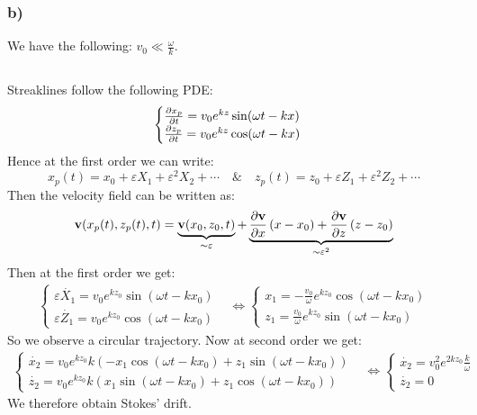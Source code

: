 \documentclass[10pt,a4paper]{book}
\begin{document}
\subsubsection{b)}
We have the following: $v_0 \ll \frac{\omega}{k}$.

\subsection{}
Streaklines follow the following PDE:
\begin{align*}
\begin{cases}
\pdv{x_p}{t} = v_0 e^{kz} \sin(\omega t - kx)\\
\pdv{z_p}{t} = v_0 e^{kz} \cos(\omega t - k x)
\end{cases}
\end{align*}
Hence at the first order we can write:
\[
x_p(t) = x_0 + \varepsilon X_1  + \varepsilon^2 X_2 + \cdots\quad \& \quad z_p(t) = z_0 + \varepsilon Z_1 + \varepsilon^2 Z_2 + \cdots
\]
Then the velocity field can be written as:
\[
\mathbf{\mathbf{v}}(x_p(t), z_p(t), t) = \underbrace{\mathbf{v}(x_0, z_0, t)}_{\sim \varepsilon} + \underbrace{\pdv{\mathbf{v}}{x} \left(x - x_0\right) + \pdv{\mathbf{v}}{z} \left(z - z_0\right)}_{\sim \varepsilon^2}
\]
Then at the first order we get:
\begin{align*}
\begin{cases}
\varepsilon \dot{X_1} = v_0 e^{kz_0}\sin(\omega t - k x_0)\\
\varepsilon \dot{Z_1} = v_0 e^{k z_0 }\cos(\omega t - k x_0)
\end{cases} &\Leftrightarrow \begin{cases}
x_1 = -\frac{v_0}{\omega} e^{kz_0} \cos(\omega t - k x_0)\\
z_1 = \frac{v_0}{\omega} e^{kz_0} \sin(\omega t - k x_0)
\end{cases}
\end{align*}
So we observe a circular trajectory. Now at second order we get:
\begin{align*}
\begin{cases}
\dot{x_2} = v_0 e^{k z_0} k (-x_1 \cos(\omega t - k x_0) + z_1 \sin(\omega t - k x_0))\\
\dot{z_2} = v_0 e^{k z_0}k (x_1 \sin(\omega t - k x_0) + z_1 \cos(\omega t - k x_0))
\end{cases} &\Leftrightarrow 
\begin{cases}
\dot{x_2} = v_0^2 e^{ 2 k z_0} \frac{k}{\omega}\\
\dot{z_2} = 0
\end{cases}
\end{align*}
We therefore obtain Stokes' drift.
\end{document}

